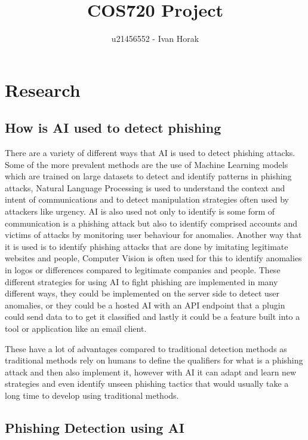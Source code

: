 \documentclass[a4paper,10pt]{article}
\title{COS720 Project}
\author{u21456552 - Ivan Horak}
\begin{document}
\maketitle
\tableofcontents

\pagebreak
\section{Research}

\subsection{How is AI used to detect phishing}

There are a variety of different ways that AI is used to detect phishing
attacks. Some of the more prevalent methods are the use of Machine Learning
models which are trained on large datasets to detect and identify patterns in
phishing attacks, Natural Language Processing is used to understand the context
and intent of communications and to detect manipulation strategies often used
by attackers like urgency. AI is also used not only to identify is some form of
communication is a phishing attack but also to identify comprised accounts and
victims of attacks by monitoring user behaviour for anomalies. Another way that
it is used is to identify phishing attacks that are done by imitating legitimate
websites and people, Computer Vision is often used for this to identify
anomalies in logos or differences compared to legitimate companies and people.
These different strategies for using AI to fight phishing are implemented in
many different ways, they could be implemented on the server side to detect user
anomalies, or they could be a hosted AI with an API endpoint that a plugin could
send data to to get it classified and lastly it could be a feature built into
a tool or application like an email client.\cite{cybersecuritynews} \par

These have a lot of advantages compared to traditional detection methods as
traditional methods rely on humans to define the qualifiers for what is a
phishing attack and then also implement it, however with AI it can adapt and
learn new strategies and even identify unseen phishing tactics that would
usually take a long time to develop using traditional methods.

\subsection{Phishing Detection using AI}
\end{document}
